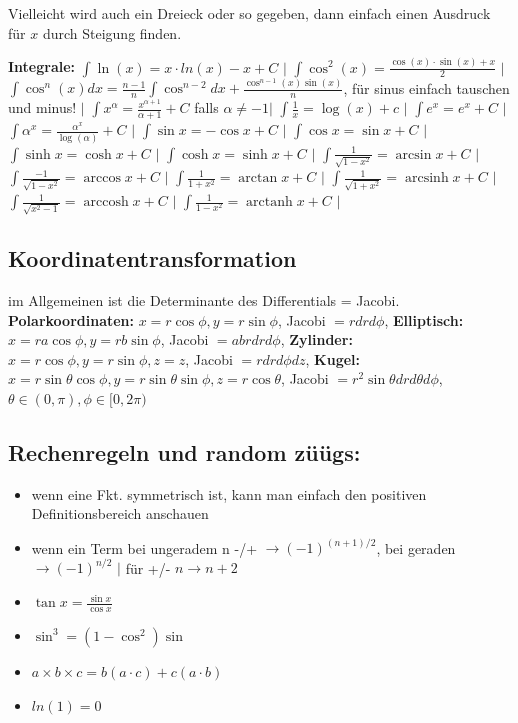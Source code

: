 \documentclass[a3paper, ngerman, 8pt]{article}
\DeclareMathOperator{\arcsinh}{arcsinh}
\DeclareMathOperator{\arccosh}{arccosh}
\DeclareMathOperator{\arctanh}{arctanh}
\begin{document}
\begin{multicols*}{3}
Vielleicht wird auch ein Dreieck oder so gegeben, dann einfach einen Ausdruck für $x$ durch Steigung finden. 

\textbf{Integrale:} 
$\int \ln(x)=x\cdot ln(x) - x + C$ $\big \vert$ 
$\int \cos^2(x)=\frac{\cos(x)\cdot \sin(x) + x}{2}$ $\big \vert$ 
$\int \cos^n(x)dx=\frac{n-1}{n}\int \cos^{n-2}dx+\frac{\cos^{n-1}(x)\sin(x)}{n}$,
für sinus einfach tauschen und minus! $\big \vert$
$\int x^{\alpha} = \frac{x^{\alpha + 1}}{\alpha + 1} + C$ falls $\alpha \neq -1 \big \vert$
$\int \frac{1}{x} = \log (x) + c$ $\big \vert$
$\int e^x = e^x + C$ $\big \vert$
$\int \alpha^{x} = \frac{\alpha^{x}}{\log (\alpha)} + C$ $\big \vert$
$\int \sin x = -\cos x + C$ $\big \vert$
$\int \cos x = \sin x + C$ $\big \vert$
$\int \sinh x = \cosh x + C$ $\big \vert$
$\int \cosh x = \sinh x + C$ $\big \vert$
$\int \frac{1}{\sqrt{1 - x^2}} = \arcsin x + C$ $\big \vert$ %
$\int \frac{-1}{\sqrt{1 - x^2}} = \arccos x + C$ $\big \vert$
$\int \frac{1}{1 + x^2} = \arctan x + C$ $\big \vert$
$\int \frac{1}{\sqrt{1 + x^2}} = \arcsinh x + C$ $\big \vert$
$\int \frac{1}{\sqrt{x^2 - 1}} = \arccosh x + C$ $\big \vert$
$\int \frac{1}{1 - x^2} = \arctanh x + C$ $\big \vert$



\subsection*{Koordinatentransformation}
im Allgemeinen ist die Determinante des Differentials = Jacobi. 
\textbf{Polarkoordinaten: } $x= r \cos\phi, y=r \sin\phi$, Jacobi $=rdrd\phi$, 
\textbf{Elliptisch:} $x=r a \cos\phi, y = r b \sin\phi$, Jacobi $=abrdrd\phi$,
\textbf{Zylinder:} $x=r \cos\phi, y=r \sin\phi, z=z$, Jacobi $=rdrd\phi dz$,
\textbf{Kugel:} $x=r \sin\theta \cos\phi, y=r \sin\theta \sin\phi, z=r \cos\theta$,
Jacobi $=r^2 \sin\theta drd\theta d\phi$, $\theta \in (0,\pi), \phi \in [0,2\pi)$

\subsection*{Rechenregeln und random züügs:} 
\begin{itemize}
	\item wenn eine Fkt. symmetrisch ist, kann man einfach den positiven Definitionsbereich anschauen
	\item wenn ein Term bei ungeradem n -/+ $\to (-1)^{(n+1)/2}$, bei geraden $\to (-1)^{n/2}$ $ \big \vert$ für +/- $n \to n+2$
	\item $\tan x = \frac{\sin x}{\cos x}$
	\item $\sin^3=(1-\cos^2)\sin$
	\item $a \times b \times c = b(a \cdot c) + c(a \cdot b)$
	\item $ln(1)=0$
\end{itemize}


\end{multicols*}
\end{document}
